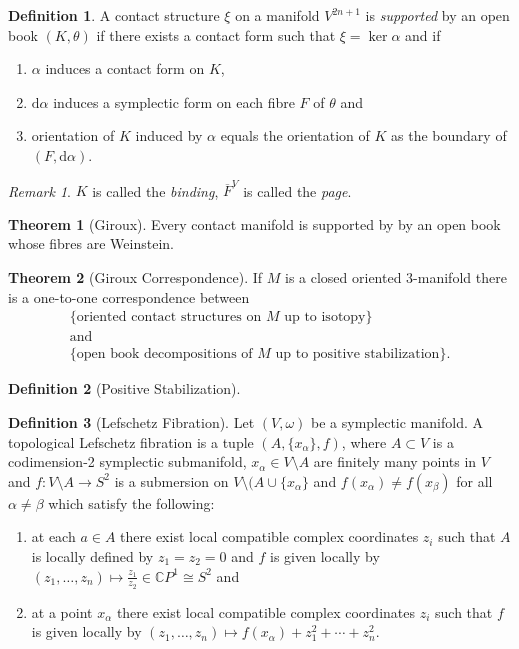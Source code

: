 \documentclass[a4paper]{article}
\newcommand{\CC}{\mathbb{C}}
\newcommand{\dd}{\mathrm{d}}
\newcommand{\lra}{\longrightarrow}
\newcommand{\ol}[1]{\overline{#1}}
\theoremstyle{definition}
\newtheorem{thm}{Theorem}
\theoremstyle{definition}
\newtheorem{definition}{Definition}
\theoremstyle{remark}
\newtheorem{rmk}{Remark}
\theoremstyle{remark}
\begin{document}
\begin{definition}
  A contact structure $\xi$ on a manifold $V^{2n+1}$ is \emph{supported} by an open book $(K,\theta)$ if there exists a contact form such that $\xi=\ker\alpha$ and if
  \begin{enumerate}
    \item $\alpha$ induces a contact form on $K$,
    \item $\dd\alpha$ induces a symplectic form on each fibre $F$ of $\theta$ and
    \item orientation of $K$ induced by $\alpha$ equals the orientation of $K$ as the boundary of $(F,\dd\alpha)$.
  \end{enumerate}
\end{definition}

\begin{rmk}
  $K$ is called the \emph{binding},  $\ol{F}^V$ is called the \emph{page}.
\end{rmk}

\begin{thm}[Giroux]
  Every contact manifold is supported by by an open book whose fibres are Weinstein.
\end{thm}

\begin{thm}[Giroux Correspondence]
  If $M$ is a closed oriented $3$-manifold there is a one-to-one correspondence between 
  \begin{gather*}
    \{\text{oriented contact structures on $M$ up to isotopy}\} \\
    \text{and} \\
    \{\text{open book decompositions of $M$ up to positive stabilization}\}.
  \end{gather*}
\end{thm}

\begin{definition}[Positive Stabilization]
  
\end{definition}

\begin{definition}[Lefschetz Fibration]
  Let $(V,\omega)$ be a symplectic manifold. A topological Lefschetz fibration is a tuple $(A,\{x_{\alpha}\},f)$, where $A\subset V$ is a codimension-2 symplectic submanifold, $x_{\alpha}\in V\setminus A$ are finitely many points in $V$ and $f:V\setminus A\lra S^2$ is a submersion on $V\setminus(A\cup\{x_{\alpha}\}$ and $f(x_{\alpha})\neq f(x_{\beta})$ for all $\alpha\neq\beta$ which satisfy the following:
  \begin{enumerate}
    \item at each $a\in A$ there exist local compatible complex coordinates $z_i$ such that $A$ is locally defined by $z_1=z_2=0$ and $f$ is given locally by $(z_1,\ldots,z_n)\longmapsto\frac{z_1}{z_2}\in\CC P^1\cong S^2$ and
    \item at a point $x_{\alpha}$ there exist local compatible complex coordinates $z_i$ such that $f$ is given locally by $(z_1,\ldots,z_n)\longmapsto f(x_{\alpha})+z_1^2+\cdots+z_n^2$.
  \end{enumerate}
\end{definition}
\end{document}

